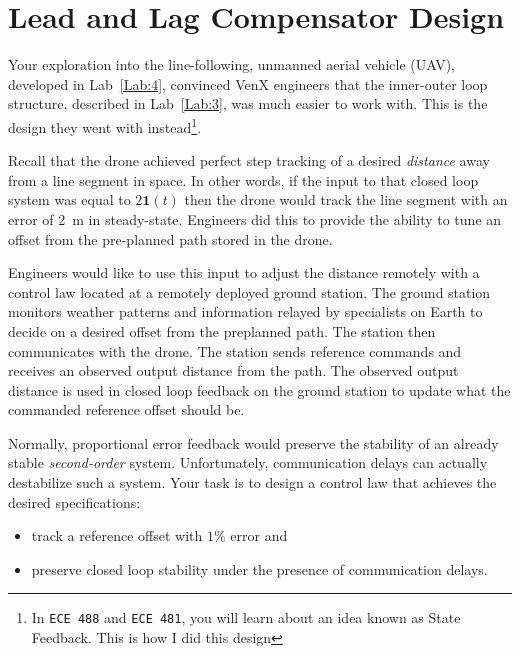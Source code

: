 \chapter{Lead and Lag Compensator Design}\label{Lab:5}
Your exploration into the line-following, unmanned aerial vehicle (UAV), developed in Lab~\ref{Lab:4}, convinced VenX engineers that the inner-outer loop structure, described in Lab~\ref{Lab:3}, was much easier to work with.
This is the design they went with instead\footnote{In \texttt{ECE 488} and \texttt{ECE 481}, you will learn about an idea known as State Feedback. This is how I did this design}.
%
\begin{center}
  
\end{center}
%
Recall that the drone achieved perfect step tracking of a desired \emph{distance} away from a line segment in space.
In other words, if the input to that closed loop system was equal to \(2\mathbf{1}(t)\) then the drone would track the line segment with an error of \SI{2}{\meter} in steady-state.
Engineers did this to provide the ability to tune an offset from the pre-planned path stored in the drone.

Engineers would like to use this input to adjust the distance remotely with a control law located at a remotely deployed ground station.
The ground station monitors weather patterns and information relayed by specialists on Earth to decide on a desired offset from the preplanned path.
The station then communicates with the drone.
The station sends reference commands and receives an observed output distance from the path.
The observed output distance is used in closed loop feedback on the ground station to update what the commanded reference offset should be.

Normally, proportional error feedback would preserve the stability of an already stable \emph{second-order} system.
Unfortunately, communication delays can actually destabilize such a system.
Your task is to design a control law that achieves the desired specifications:
\begin{itemize}
  \item{track a reference offset with \(1\%\) error and}
  \item{preserve closed loop stability under the presence of communication delays.}
\end{itemize}

